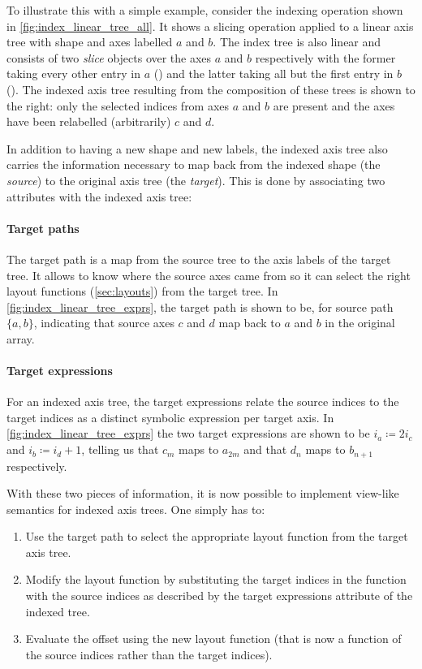 \documentclass[thesis]{subfiles}
\begin{document}
To illustrate this with a simple example, consider the indexing operation shown in \cref{fig:index_linear_tree_all}.
It shows a slicing operation applied to a linear axis tree with shape  and axes labelled $a$ and $b$.
The index tree is also linear and consists of two \textit{slice} objects over the axes $a$ and $b$ respectively with the former taking every other entry in $a$ (\pycode{[::2]}) and the latter taking all but the first entry in $b$ (\pycode{[1::]}).
The indexed axis tree resulting from the composition of these trees is shown to the right: only the selected indices from axes $a$ and $b$ are present and the axes have been relabelled (arbitrarily) $c$ and $d$.

In addition to having a new shape and new labels, the indexed axis tree also carries the information necessary to map back from the indexed shape (the \textit{source}) to the original axis tree (the \textit{target}).
This is done by associating two attributes with the indexed axis tree:

\paragraph{Target paths}

The target path is a map from the source tree to the axis labels of the target tree.
It allows  to know where the source axes came from so it can select the right layout functions (\cref{sec:layouts}) from the target tree.
In \cref{fig:index_linear_tree_exprs}, the target path is shown to be, for source path $\{a, b\}$, indicating that source axes $c$ and $d$ map back to $a$ and $b$ in the original array.

\paragraph{Target expressions}

For an indexed axis tree, the target expressions relate the source indices to the target indices as a distinct symbolic expression per target axis.
In \cref{fig:index_linear_tree_exprs} the two target expressions are shown to be $i_a \coloneq 2 i_c$ and $i_b \coloneq i_d + 1$, telling us that $c_m$ maps to $a_{2m}$ and that $d_n$ maps to $b_{n+1}$ respectively.

With these two pieces of information, it is now possible to implement view-like semantics for indexed axis trees.
One simply has to:

\begin{enumerate}
  \item
    Use the target path to select the appropriate layout function from the target axis tree.
  \item
    Modify the layout function by substituting the target indices in the function with the source indices as described by the target expressions attribute of the indexed tree.
  \item
    Evaluate the offset using the new layout function (that is now a function of the source indices rather than the target indices).
\end{enumerate}
\end{document}
